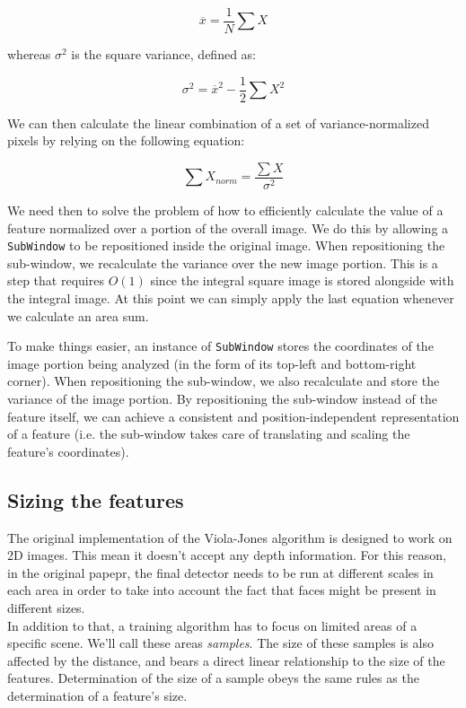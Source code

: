 \documentclass[a4paper,11pt,titlepage]{article}
\begin{document}
\[ \overline{x} = \dfrac{1}{N} \sum X \]

whereas $\sigma^{2}$ is the square variance, defined as:

\[ \sigma^{2} = \overline{x}^{2} - \dfrac{1}{2} \sum X^{2} \]

We can then calculate the linear combination of a set of variance-normalized
pixels by relying on the following equation:

\[ \sum X_{norm} = \dfrac{\sum X}{\sigma^{2}} \]

We need then to solve the problem of how to efficiently calculate the value of a
feature normalized over a portion of the overall image. We do this by allowing a
\texttt{SubWindow} to be repositioned inside the original image. When
repositioning the sub-window, we recalculate the variance over the new image
portion. This is a step that requires $O(1)$ since the integral square image is
stored alongside with the integral image. At this point we can simply apply the
last equation whenever we calculate an area sum.

To make things easier, an instance of \texttt{SubWindow} stores the coordinates
of the image portion being analyzed (in the form of its top-left and
bottom-right corner). When repositioning the sub-window, we also recalculate and
store the variance of the image portion. By repositioning the sub-window instead
of the feature itself, we can achieve a consistent and position-independent
representation of a feature (i.e. the sub-window takes care of translating and
scaling the feature's coordinates).

\subsection{Sizing the features}
The original implementation of the Viola-Jones algorithm is designed to work on
2D images. This mean it doesn't accept any depth information. For this reason,
in the original papepr, the final detector needs to be run at different scales
in each area in order to take into account the fact that faces might be present
in different sizes. \\
In addition to that, a training algorithm has to focus on limited areas of a
specific scene. We'll call these areas \emph{samples}. The size of these samples
is also affected by the distance, and bears a direct linear relationship to the
size of the features. Determination of the size of a sample obeys the same rules
as the determination of a feature's size.
\end{document}
